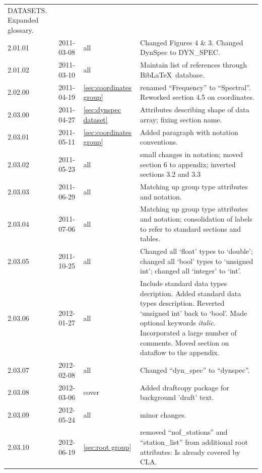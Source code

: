 \documentclass[a4paper,10pt,bibtotoc]{scrartcl}
\begin{document}
\begin{center}
\begin{supertabular}{lllp{10cm}}
    DATASETS. Expanded glossary.\\ 
    2.01.01 & 2011-03-08 & all & Changed Figures 4 \& 3. Changed DynSpec to DYN\_SPEC.\\ 
    2.01.02 & 2011-03-10 & all & Maintain list of references through Bib\LaTeX\ database. \\
    2.02.00 & 2011-04-19 & \ref{sec:coordinates group} & renamed ``Frequency'' to ``Spectral''.
    Reworked section 4.5 on coordinates.\\ 
    2.03.00 & 2011-04-27 & \ref{sec:dynspec dataset} & Attributes
    describing shape of data array; fixing section name. \\
    2.03.01 & 2011-05-11 & \ref{sec:coordinates group} & Added
    paragraph with notation conventions. \\
    2.03.02 & 2011-05-23 & all & small changes in notation; moved section 6 to
    appendix; inverted sections 3.2 and 3.3 \\
    2.03.03 & 2011-06-29 & all & Matching up group type attributes and
    notation.\\
    2.03.04 & 2011-07-06 & all & Matching up group type attributes and
    notation; consolidation of labels to refer to standard sections
    and tables. \\
    2.03.05 & 2011-10-25 & all & Changed all `float' types to `double';  
    changed all `bool' types to `unsigned int';  changed all `integer' to
    `int'.\\
    2.03.06 & 2012-01-27 & all & Include standard data types decription. 
    Added standard data types description. Reverted `unsigned int' back to
    `bool'. Made optional keywords \textit{italic}. Incorporated a large number
    of comments. Moved section on dataflow to the appendix.\\ 
    2.03.07 & 2012-02-08 & all & Changed ``dyn\_spec'' to ``dynspec''.\\     
    2.03.08 & 2012-03-06 & cover   & Added draftcopy package for background 'draft' text.\\
    2.03.09 & 2012-05-24 & all   & minor changes.\\
    2.03.10 & 2012-06-19 & \ref{sec:root group} & removed ``nof\_stations'' and ``station\_list''
    from additional root attributes: Is already covered by CLA.\\
    
  \end{supertabular}
\end{center}
\end{document}
